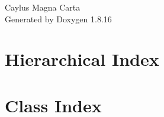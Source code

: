 \let\mypdfximage\pdfximage\def\pdfximage{\immediate\mypdfximage}\documentclass[twoside]{book}
\newcommand{\+}{\discretionary{\mbox{\scriptsize$\hookleftarrow$}}{}{}}
\newcommand{\clearemptydoublepage}{%
  \newpage{\pagestyle{empty}\cleardoublepage}%
}
\begin{document}
\hypersetup{pageanchor=false,
             bookmarksnumbered=true,
             pdfencoding=unicode
            }
\begin{titlepage}
\vspace*{7cm}
\begin{center}%
{\Large Caylus Magna Carta }\\
\vspace*{1cm}
{\large Generated by Doxygen 1.8.16}\\
\end{center}
\end{titlepage}
\clearemptydoublepage
{}
\tableofcontents
\clearemptydoublepage
{}
\hypersetup{pageanchor=true}

\chapter{Hierarchical Index}

\chapter{Class Index}

\end{document}
